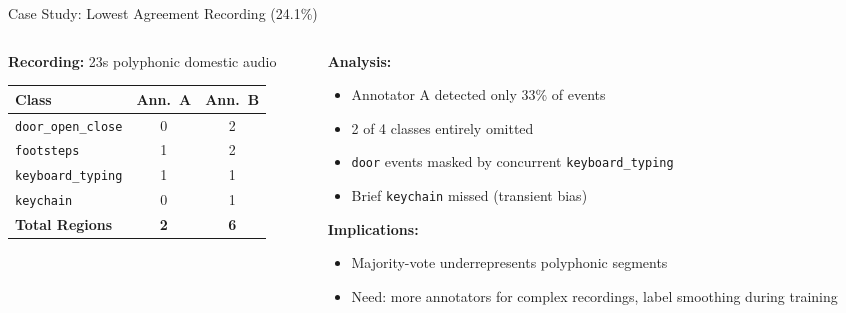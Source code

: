 \documentclass[aspectratio=169]{beamer}
\begin{document}
\begin{frame}{Case Study: Lowest Agreement Recording (24.1\%)}
  \begin{columns}[T]
    \begin{column}{0.45\textwidth}
      \textbf{Recording:} 23s polyphonic domestic audio
      \vspace{0.5em}

      \centering
      \begin{tabular}{lcc}
        \toprule
        Class & Ann.\ A & Ann.\ B \\
        \midrule
        \texttt{door\_open\_close} & 0 & 2 \\
        \texttt{footsteps} & 1 & 2 \\
        \texttt{keyboard\_typing} & 1 & 1 \\
        \texttt{keychain} & 0 & 1 \\
        \midrule
        \textbf{Total Regions} & \textbf{2} & \textbf{6} \\
        \bottomrule
      \end{tabular}
    \end{column}
    \begin{column}{0.5\textwidth}
      \textbf{Analysis:}
      \begin{itemize}
        \item Annotator A detected only 33\% of events
        \item 2 of 4 classes entirely omitted
        \item \texttt{door} events masked by concurrent \texttt{keyboard\_typing}
        \item Brief \texttt{keychain} missed (transient bias)
      \end{itemize}
      \vspace{0.5em}
      \textbf{Implications:}
      \begin{itemize}
        \item Majority-vote underrepresents polyphonic segments
        \item Need: more annotators for complex recordings, label smoothing during training
      \end{itemize}
    \end{column}
  \end{columns}
\end{frame}
\end{document}
